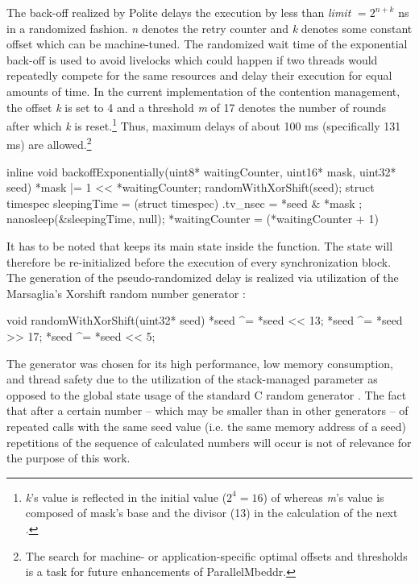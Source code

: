 The back-off realized by Polite delays the execution  by less than \textit{limit} $ = 2^{n+k}$ ns \cite{AdvancedContentionManagement} in a randomized fashion. \textit{n} denotes the retry counter and \textit{k} denotes some constant offset which can be machine-tuned. The randomized wait time of the exponential back-off is used to avoid livelocks which could happen if two threads would repeatedly compete for the same resources and delay their execution for equal amounts of time. In the current implementation  of the contention management, the offset \textit{k} is set to 4 and a threshold \textit{m} of 17 denotes the number of rounds after which \textit{k} is reset.\footnote{\textit{k}'s value is reflected in the initial value ($2^4 = 16$) of  whereas \textit{m}'s value is composed of mask's base and the divisor (13) in the calculation of the next .} Thus, maximum delays of about 100 ms (specifically 131 ms) are allowed.\footnote{The search for machine- or application-specific optimal offsets and thresholds is a task for future enhancements of ParallelMbeddr.}
\begin{ccode}
inline void backoffExponentially(uint8* waitingCounter, uint16* mask, uint32* seed) { 
  *mask |= 1 << *waitingCounter; 
  randomWithXorShift(seed); 
  struct timespec sleepingTime = (struct timespec){ .tv_nsec = *seed & *mask }; 
  nanosleep(&sleepingTime, null); 
  *waitingCounter = (*waitingCounter + 1) %
}
\end{ccode}
It has to be noted that  keeps its main state inside the  function. The state will therefore be re-initialized before the execution of every synchronization block. The generation of the pseudo-randomized delay is realized via utilization of the Marsaglia's Xorshift random number generator \cite{XorshiftRngs}:
\begin{ccode}
void randomWithXorShift(uint32* seed) { 
  *seed ^= *seed << 13; 
  *seed ^= *seed >> 17; 
  *seed ^= *seed << 5; 
}
\end{ccode}
The generator was chosen for its high performance, low memory consumption, and thread safety due to the utilization of the stack-managed  parameter as opposed to the global state usage of the standard C random generator . The fact that after a certain number -- which may be smaller than in other generators -- of repeated calls with the same seed value (i.e. the same memory address of a seed) repetitions of the sequence of calculated numbers will occur is not of relevance for the purpose of this work.

